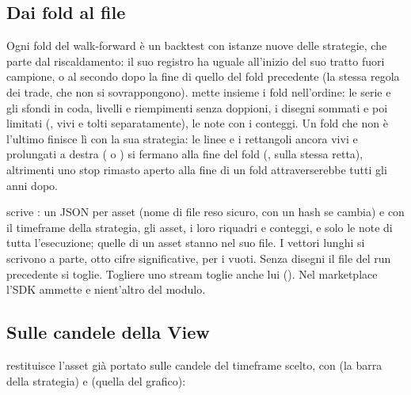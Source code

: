 \subsection{Dai fold al file}

Ogni fold del walk-forward è un backtest con istanze nuove delle strategie,
che parte dal riscaldamento: il suo registro ha  uguale all'inizio
del suo tratto fuori campione, o al secondo dopo la fine di quello del fold
precedente (la stessa regola dei trade, che non si sovrappongono).
 mette insieme i fold nell'ordine: le serie e gli sfondi in
coda, livelli e riempimenti senza doppioni, i disegni sommati e poi limitati
(, vivi e tolti separatamente), le note con i
conteggi. Un fold che non è l'ultimo finisce lì con la sua strategia: le
linee e i rettangoli ancora vivi e prolungati a destra
( o ) si fermano alla fine del fold
(, sulla stessa retta), altrimenti uno stop rimasto
aperto alla fine di un fold attraverserebbe tutti gli anni dopo.

 scrive :
un JSON per asset (nome di file reso sicuro, con un hash se cambia) e
 con il timeframe della strategia, gli asset, i loro
riquadri e conteggi, e solo le note di tutta l'esecuzione; quelle di un asset
stanno nel suo file. I vettori lunghi si scrivono a parte, otto cifre
significative,  per i vuoti. Senza disegni il file del run
precedente si toglie. Togliere uno stream toglie anche lui
(). Nel marketplace l'SDK ammette
 e nient'altro del modulo.

\subsection{Sulle candele della View}

 restituisce
l'asset già portato sulle candele del timeframe scelto, con  (la
barra della strategia) e  (quella del grafico):

